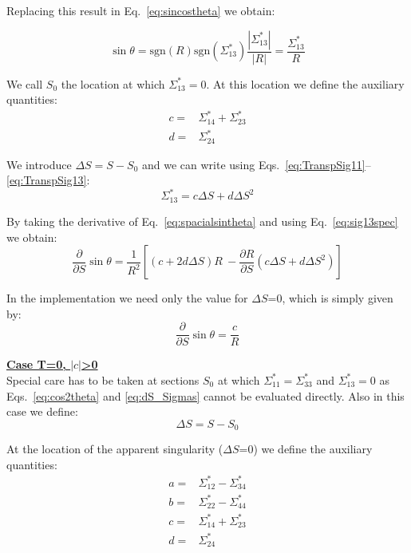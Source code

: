 Replacing this result in Eq.~\ref{eq:sincostheta} we obtain:

\begin{equation}
\sin \theta = \mathrm{sgn}(R)\mathrm{sgn}(\Sigma^*_{13})\frac{\left| \Sigma^*_{13} \right|}{\left| R \right|} = \frac{\Sigma^*_{13} }{ R } \label{eq:spacialsintheta}
\end{equation}





We call $S_0$ the location at which ${\Sigma}^*_{13}=0$. At this location we define the auxiliary quantities:
\begin{align}
c =& \Sigma^*_{14} + \Sigma^*_{23}\\
d =& \Sigma^*_{24}
\end{align}

We introduce $\Delta S = S - S_0$ and we can write using Eqs.~\ref{eq:TranspSig11}--\ref{eq:TranspSig13}:
\begin{equation}
\Sigma^*_{13} = c \Delta S +d \Delta S^2 \label{eq:sig13spec}
\end{equation}

By taking the derivative of Eq.~\ref{eq:spacialsintheta} and using Eq.~\ref{eq:sig13spec} we obtain:
\begin{equation}
\frac{\partial }{\partial S} \sin \theta =\frac{1}{R^2}\left[\left(c + 2d \Delta S \right) R \ - \frac{\partial R }{\partial S}\left(c\Delta S + d \Delta S^2 \right)\right]
\end{equation}

In the implementation we need only the value for $\Delta S$=0, which is simply given by:
\begin{equation}
\frac{\partial }{\partial S} \sin \theta =\frac{c}{R}
\end{equation}
 
 
 
\textbf{\underline{Case T=0, $\left| c \right|$>0}}
~\\

Special care has to be taken at sections $S_0$ at which ${\Sigma}^*_{11}={\Sigma}^*_{33}$ and ${\Sigma}^*_{13}=0$ as Eqs.~\ref{eq:cos2theta}  and \ref{eq:dS_Sigmas} cannot be evaluated directly. Also in this case we define:
\begin{equation}
\Delta S = S - S_0
\end{equation}

At the location of the apparent singularity ($\Delta S$=0) we define the auxiliary quantities:
\begin{align}
a =& \Sigma^*_{12} - \Sigma^*_{34}\\
b =& \Sigma^*_{22} - \Sigma^*_{44}\\
c =& \Sigma^*_{14} + \Sigma^*_{23}\\
d =& \Sigma^*_{24} 
\end{align}

